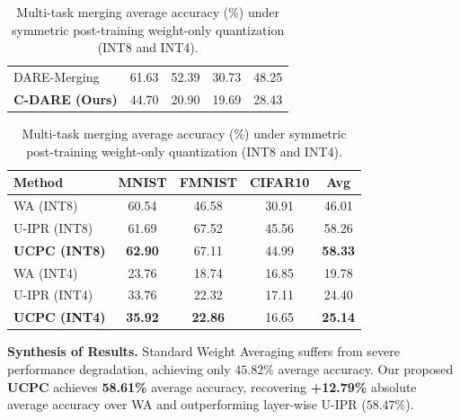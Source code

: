\documentclass{article}
\theoremstyle{plain}
\theoremstyle{definition}
\theoremstyle{remark}
\begin{document}
\begin{table}[t]
\begin{minipage}{0.54\textwidth}
\begin{small}
\begin{sc}
\begin{tabular}{lcccc}
          DARE-Merging & 61.63 & 52.39 & 30.73 & 48.25 \\
          \textbf{C-DARE (Ours)} & 44.70 & 20.90 & 19.69 & 28.43 \\
          \bottomrule
        \end{tabular}
      \end{sc}
    \end{small}
  \end{minipage}
  \hfill
  \begin{minipage}{0.44\textwidth}
    \centering
    \caption{Multi-task merging average accuracy (\%) under symmetric post-training weight-only quantization (INT8 and INT4).}
    \label{tab:quantization_results}
    \vskip 0.03in
    \begin{small}
      \begin{sc}
        \setlength{\tabcolsep}{1.5pt}
        \begin{tabular}{lcccc}
          \toprule
          Method & MNIST & FMNIST & CIFAR10 & Avg \\
          \midrule
          WA (INT8) & 60.54 & 46.58 & 30.91 & 46.01 \\
          U-IPR (INT8) & 61.69 & 67.52 & 45.56 & 58.26 \\
          \textbf{UCPC (INT8)} & \textbf{62.90} & 67.11 & 44.99 & \textbf{58.33} \\
          \midrule
          WA (INT4) & 23.76 & 18.74 & 16.85 & 19.78 \\
          U-IPR (INT4) & 33.76 & 22.32 & 17.11 & 24.40 \\
          \textbf{UCPC (INT4)} & \textbf{35.92} & \textbf{22.86} & 16.65 & \textbf{25.14} \\
          \bottomrule
        \end{tabular}
      \end{sc}
    \end{small}
  \end{minipage}
  \vspace{-5pt}
\end{table}

\textbf{Synthesis of Results.} Standard Weight Averaging suffers from severe performance degradation, achieving only $45.82\%$ average accuracy. Our proposed \textbf{UCPC} achieves \textbf{58.61\%} average accuracy, recovering \textbf{+12.79\%} absolute average accuracy over WA and outperforming layer-wise U-IPR ($58.47\%$).
\end{document}
